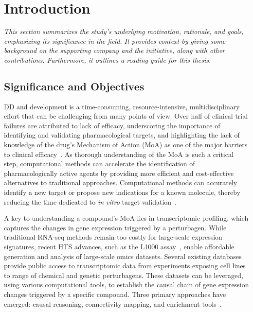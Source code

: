 ﻿%

%

\makeatletter
\newcommand{\ntifpkgloaded}{%
  \@ifpackageloaded%
}
\makeatother

\chapter{Introduction}
\label{cha:introduction}

\textit{This section summarizes the study's underlying motivation, rationale, and goals, emphasizing its significance in the field. It provides context by giving some background on the supporting company and the initiative, along with other contributions. Furthermore, it outlines a reading guide for this thesis.}

\section{Significance and Objectives} %
\label{sec:significanceandobjectives}


\gls{DD} and development is a time-consuming, resource-intensive, multidisciplinary effort that can be challenging from many points of view. 
Over half of clinical trial failures are attributed to lack of efficacy, underscoring the importance of identifying and validating pharmacological targets, and highlighting the lack of knowledge of the drug's \gls{Mechanism of Action (MoA)} as one of the major barriers to clinical efficacy~\cite{RN3, RN1, RN2}. 
As thorough understanding of the \gls{MoA} is such a critical step, computational methods can accelerate the identification of pharmacologically active agents by providing more efficient and cost-effective alternatives to traditional approaches. 
Computational methods can accurately identify a new target or propose new indications for a known molecule, thereby reducing the time dedicated to \textit{in vitro} target validation~\cite{RN29}.

A key to understanding a compound's \gls{MoA} lies in transcriptomic profiling, which captures the changes in gene expression triggered by a perturbagen. 
While traditional \gls{RNA-seq} methods remain too costly for large-scale expression signatures, recent \gls{HTS} advances, such as the L1000 assay~\cite{RN30}, enable affordable generation and analysis of large-scale omics datasets. 
Several existing databases provide public access to transcriptomic data from experiments exposing cell lines to range of chemical and genetic perturbagens. 
These datasets can be leveraged, using various computational tools, to establish the causal chain of gene expression changes triggered by a specific compound. 
Three primary approaches have emerged: causal reasoning, connectivity mapping, and enrichment tools~\cite{RN31}.

